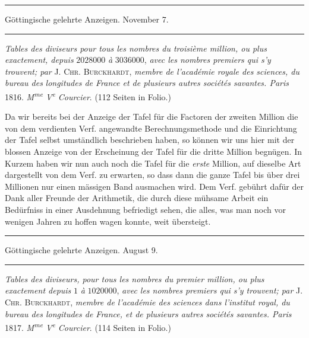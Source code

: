 \begin{center}
\rule{.86\linewidth}{.3pt}\par
Göttingische gelehrte Anzeigen. November 7.\par
\rule{.86\linewidth}{.3pt}
\end{center}
\emph{Tables des diviseurs pour tous les nombres du troisième million, ou plus exactement, depuis} $2028000$ \emph{à} $3036000$, \emph{avec les nombres premiers qui s'y trouvent; par} \textsc{J. Chr. Burckhardt}, \emph{membre de l'académie royale des sciences, du bureau des }
%
\emph{longitudes de France et de plusieurs autres sociétés savantes. Paris} 1816. \emph{M\textsuperscript{me} V\textsuperscript{e} Courcier}. (112 Seiten in Folio.)

Da wir bereits bei der Anzeige der Tafel für die Factoren der zweiten Million die von dem verdienten Verf. angewandte Berechnungsmethode und die Einrichtung der Tafel selbst umständlich beschrieben haben, so können wir uns hier mit der blossen Anzeige von der Erscheinung der Tafel für die dritte Million begnügen. In Kurzem haben wir nun auch noch die Tafel für die \emph{erste} Million, auf dieselbe Art dargestellt von dem Verf. zu erwarten, so dass dann die ganze Tafel bis über drei Millionen nur einen mässigen Band ausmachen wird. Dem Verf. gebührt dafür der Dank aller Freunde der Arithmetik, die durch diese mühsame Arbeit ein Bedürfniss in einer Ausdehnung befriedigt sehen, die alles, was man noch vor wenigen Jahren zu hoffen wagen konnte, weit übersteigt.

\begin{center}
\rule{.86\linewidth}{.3pt}\par
Göttingische gelehrte Anzeigen. August 9.\par
\rule{.86\linewidth}{.3pt}
\end{center}
\emph{Tables des diviseurs, pour tous les nombres du premier million, ou plus exactement depuis} $1$ \emph{à} $1020000$, \emph{avec les nombres premiers qui s'y trouvent; par} \textsc{J. Chr. Burckhardt}, \emph{membre de l'académie des sciences dans l'institut royal, du bureau des longitudes de France, et de plusieurs autres sociétés savantes. Paris} 1817. \emph{M\textsuperscript{me} V\textsuperscript{e} Courcier}. (114 Seiten in Folio.)

